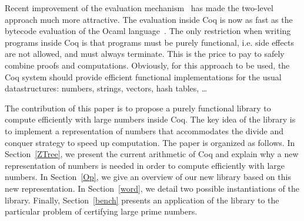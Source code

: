 Recent improvement of the evaluation mechanism~\cite{GreLer} has made the two-level
approach much more attractive.  The evaluation inside Coq is now as fast as the bytecode evaluation of
the {\sc Ocaml} language~\cite{Ocaml}. The only restriction when writing programs
inside {\sc Coq} is that programs must be purely functional, i.e. side effects are not allowed,
and must always terminate. This is the price to pay to safely combine proofs
and computations. Obviously, for this approach to be used, 
the {\sc Coq} system should provide efficient functional implementations for the
usual datastructures: numbers, strings, vectors, hash tables, \dots 

The contribution of this paper is to propose a purely functional library to compute 
efficiently with large numbers inside {\sc Coq}. The key idea of the library is to 
implement a representation of numbers that accommodates the divide and conquer strategy 
to speed up computation. The paper is organized as follows. In Section~\ref{ZTree}, we present 
the current arithmetic of {\sc Coq} and explain why a new representation of numbers is needed
in order to compute efficiently with large numbers. In Section~\ref{Op}, we give an overview of our new library
based on this new representation.  
In Section~\ref{word}, we detail two possible instantiations of the library.
Finally, Section~\ref{bench} presents an application of the library to the particular
problem of certifying large prime numbers.